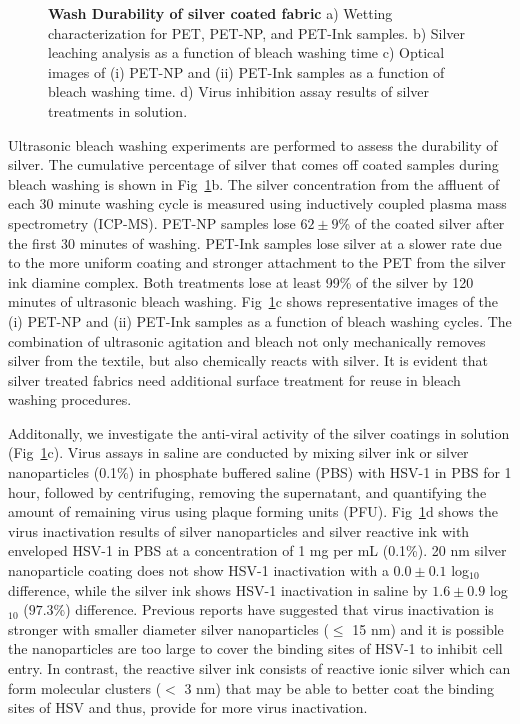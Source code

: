 \documentclass[10pt,letterpaper]{article}
\begin{document}
\begin{figure}[!h]
\caption{{\bf Wash Durability of silver coated fabric}{
a) Wetting characterization for PET, PET-NP, and PET-Ink samples. b) Silver leaching analysis as a function of bleach washing time c) Optical images of (i) PET-NP and (ii) PET-Ink samples as a function of bleach washing time. d) Virus inhibition assay results of silver treatments in solution.}}
\label{fig2}
\end{figure}

Ultrasonic bleach washing experiments are performed to assess the durability of silver.  
The cumulative percentage of silver that comes off coated samples during bleach washing is shown in 
Fig~\ref{fig2}b. The silver concentration from the affluent of each 30 minute washing cycle is measured using inductively coupled plasma mass spectrometry (ICP-MS). 
PET-NP samples lose $62 \pm 9$\% of the coated silver after the first 30 minutes of washing. 
PET-Ink samples lose silver at a slower rate due to the more uniform coating and stronger attachment to the PET from the silver ink diamine complex. 
Both treatments lose at least 99\% of the silver by 120 minutes of ultrasonic bleach washing. 
Fig~\ref{fig2}c shows representative images of the (i) PET-NP and (ii) PET-Ink samples as a function of bleach washing cycles.  
The combination of ultrasonic agitation and bleach not only mechanically removes silver from the textile, but also chemically reacts with silver. %
It is evident that silver treated fabrics need additional surface treatment for reuse in bleach washing procedures. 

Additonally, we investigate the anti-viral activity of the silver coatings in solution (Fig~\ref{fig2}c). 
Virus assays in saline are conducted by mixing silver ink or silver nanoparticles (0.1\%) in phosphate buffered saline (PBS) with HSV-1 in PBS for 1 hour, followed by centrifuging, removing the supernatant, and quantifying the amount of remaining virus using plaque forming units (PFU). 
Fig~\ref{fig2}d shows the virus inactivation results of silver nanoparticles and silver reactive ink
with enveloped HSV-1 in PBS at a concentration of 1 mg per mL (0.1\%). 
20 nm silver nanoparticle coating does not show HSV-1 inactivation with a $0.0 \pm 0.1$ log$_{10}$ difference, while the silver ink shows HSV-1 inactivation in saline by $1.6 \pm 0.9$ log$_{10}$ ($97.3 %
\%$) difference. 
Previous reports have suggested that virus inactivation is stronger with smaller diameter silver nanoparticles ($\leq$ 15 nm) and it is possible the nanoparticles are too large to cover the binding sites of HSV-1 to inhibit cell entry.\cite{jeremiah_potent_2020}
In contrast, the reactive silver ink %
consists of reactive ionic silver which can form molecular clusters ($<$ 3 nm) that may be able to better coat the binding sites of HSV and thus, provide for more virus inactivation. 
\end{document}
